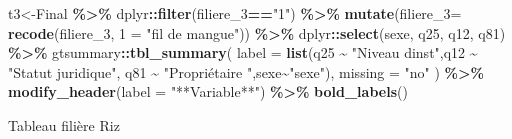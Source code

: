 \documentclass[
]{article}
\newenvironment{Shaded}{\begin{snugshade}}{\end{snugshade}}
\newcommand{\AttributeTok}[1]{\textcolor[rgb]{0.13,0.29,0.53}{#1}}
\newcommand{\FunctionTok}[1]{\textcolor[rgb]{0.13,0.29,0.53}{\textbf{#1}}}
\newcommand{\NormalTok}[1]{#1}
\newcommand{\OtherTok}[1]{\textcolor[rgb]{0.56,0.35,0.01}{#1}}
\newcommand{\SpecialCharTok}[1]{\textcolor[rgb]{0.81,0.36,0.00}{\textbf{#1}}}
\newcommand{\StringTok}[1]{\textcolor[rgb]{0.31,0.60,0.02}{#1}}
\begin{document}
\begin{Shaded}
\begin{Highlighting}[]
\NormalTok{t3}\OtherTok{\textless{}{-}}\NormalTok{Final }\SpecialCharTok{\%\textgreater{}\%}
\NormalTok{  dplyr}\SpecialCharTok{::}\FunctionTok{filter}\NormalTok{(filiere\_3}\SpecialCharTok{==}\StringTok{"1"}\NormalTok{) }\SpecialCharTok{\%\textgreater{}\%} 
  \FunctionTok{mutate}\NormalTok{(}\AttributeTok{filiere\_3=} \FunctionTok{recode}\NormalTok{(filiere\_3, }\StringTok{\textasciigrave{}}\AttributeTok{1}\StringTok{\textasciigrave{}} \OtherTok{=} \StringTok{"fil de mangue"}\NormalTok{)) }\SpecialCharTok{\%\textgreater{}\%}
\NormalTok{  dplyr}\SpecialCharTok{::}\FunctionTok{select}\NormalTok{(sexe, q25, q12, q81) }\SpecialCharTok{\%\textgreater{}\%}
\NormalTok{  gtsummary}\SpecialCharTok{::}\FunctionTok{tbl\_summary}\NormalTok{(}
      \AttributeTok{label =} \FunctionTok{list}\NormalTok{(q25 }\SpecialCharTok{\textasciitilde{}} \StringTok{"Niveau d\textquotesingle{}inst"}\NormalTok{,q12 }\SpecialCharTok{\textasciitilde{}} \StringTok{"Statut juridique"}\NormalTok{,}
\NormalTok{            q81 }\SpecialCharTok{\textasciitilde{}} \StringTok{"Propriétaire "}\NormalTok{,sexe}\SpecialCharTok{\textasciitilde{}}\StringTok{"sexe"}\NormalTok{),}
          \AttributeTok{missing =} \StringTok{"no"}
\NormalTok{        ) }\SpecialCharTok{\%\textgreater{}\%} \FunctionTok{modify\_header}\NormalTok{(}\AttributeTok{label =} \StringTok{"**Variable**"}\NormalTok{) }\SpecialCharTok{\%\textgreater{}\%} 
  \FunctionTok{bold\_labels}\NormalTok{()}
\end{Highlighting}
\end{Shaded}

Tableau filière Riz
\end{document}
